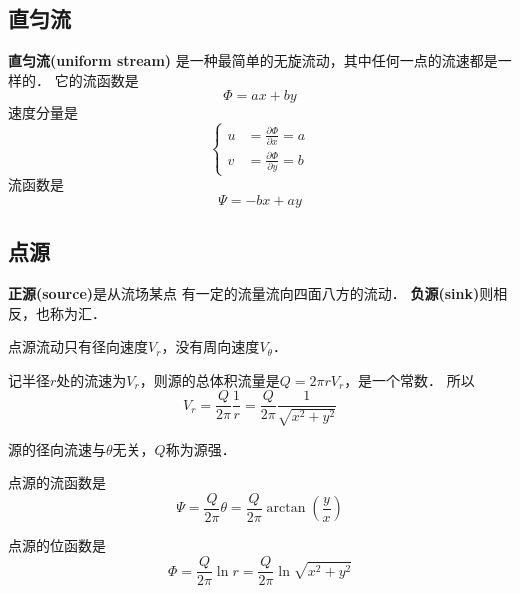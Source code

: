 \subsection{直匀流}
{\bfseries 直匀流(uniform stream)}
是一种最简单的无旋流动，其中任何一点的流速都是一样的．
它的流函数是
\[
  \Phi=ax+by
\]
速度分量是
\begin{equation*}
  \begin{cases}
    u&=\frac{\partial \Phi}{\partial x}=a \\ 
    v&=\frac{\partial \Phi}{\partial y}=b
  \end{cases}
\end{equation*}
流函数是
\[
  \Psi=-bx+ay
\]

\subsection{点源}
{\bfseries 正源(source)}是从流场某点
有一定的流量流向四面八方的流动．{\bfseries
负源(sink)}则相反，也称为汇．

\begin{note}
 点源流动只有径向速度$V_r$，没有周向速度$V_\theta$．
\end{note}

记半径$r$处的流速为$V_r$，则源的总体积流量是$Q=2
\pi r V_r$，是一个常数．
所以
\[
  V_r=\frac{Q}{2\pi}\frac{1}{r }=\frac{Q}{2\pi}
  \frac{1}{\sqrt{x^2+y^2}}
\]
\begin{note}
 源的径向流速与$\theta$无关，$Q$称为源强．
\end{note}
点源的流函数是
\[
  \Psi=\frac{Q}{2\pi}\theta=\frac{Q}{2\pi}\arctan
  \left(\frac{y}{x}\right)
\]

点源的位函数是
\[
  \Phi=\frac{Q}{2\pi}\ln r =\frac{Q}{2\pi}
  \ln \sqrt{x^2+y^2} 
\]


